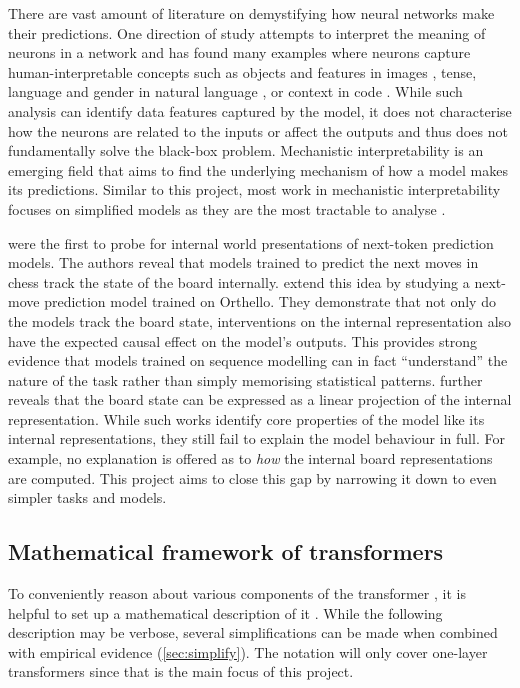 \documentclass{article}
\begin{document}
There are vast amount of literature on demystifying how neural networks make their predictions. One direction of study attempts to interpret the meaning of neurons in a network and has found many examples where neurons capture human-interpretable concepts such as objects and features in images \cite{bau2020understanding,cammarata2020thread:,zhou2014object}, tense, language and gender in natural language \cite{bau2018identifying,gurnee2023finding}, or context in code \cite{karpathy2015visualizing}. While such analysis can identify data features captured by the model, it does not characterise how the neurons are related to the inputs or affect the outputs and thus does not fundamentally solve the black-box problem. Mechanistic interpretability is an emerging field that aims to find the underlying mechanism of how a model makes its predictions. Similar to this project, most work in mechanistic interpretability focuses on simplified models as they are the most tractable to analyse \cite{elhage2022toy,elhage2021mathematical,olsson2022context,nanda2023progress}.

\citet{toshniwal2021learning} were the first to probe for internal world presentations of next-token prediction models. The authors reveal that models trained to predict the next moves in chess track the state of the board internally. \citet{orthello-gpt} extend this idea by studying a next-move prediction model trained on Orthello. They demonstrate that not only do the models track the board state, interventions on the internal representation also have the expected causal effect on the model's outputs. This provides strong evidence that models trained on sequence modelling can in fact ``understand'' the nature of the task rather than simply memorising statistical patterns. \citet{linear-orthello-gpt} further reveals that the board state can be expressed as a linear projection of the internal representation. While such works identify core properties of the model like its internal representations, they still fail to explain the model behaviour in full. For example, no explanation is offered as to \emph{how} the internal board representations are computed. This project aims to close this gap by narrowing it down to even simpler tasks and models.

\subsection{Mathematical framework of transformers} \label{sec:math}

To conveniently reason about various components of the transformer \citep{vaswani2017attention}, it is helpful to set up a mathematical description of it \citep{elhage2021mathematical}. While the following description may be verbose, several simplifications can be made when combined with empirical evidence (\cref{sec:simplify}). The notation will only cover one-layer transformers since that is the main focus of this project.
\end{document}
